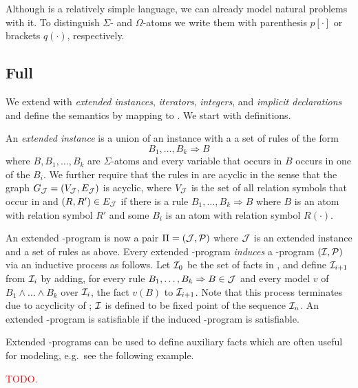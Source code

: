 \documentclass[conference]{IEEEtran}
\begin{document}
{\color{red} Although \bcore is a relatively simple language, we can
already model natural problems with it. To distinguish $\Sigma$- and
$\Omega$-atoms we write them with parenthesis $p[\cdot]$ or brackets
$q(\cdot)$,
respectively.



\begin{example}
  
\end{example}

}


\subsection{Full \bule}

We extend \bcore with \emph{extended instances}, \emph{iterators},
\emph{integers}, and \emph{implicit declarations} and define the
semantics by mapping to \bcore. We start with definitions. 

An \emph{extended instance \Jmc} is a union of an instance \Imc with a
a set of rules of the form
%
\[B_1,\ldots,B_k\Rightarrow B\]
%
where $B,B_1,\ldots,B_k$ are $\Sigma$-atoms and every variable that
occurs in $B$ occurs in one of the $B_i$. We further require that the
rules in \Jmc are acyclic in the sense that the graph $G_\mathcal{J} = (V_\mathcal{J},E_\mathcal{J})$ is
acyclic, where $V_\mathcal{J}$ is the set of all relation symbols that occur in
\Jmc and $(R,R')\in E_\mathcal{J}$ if there is a rule
$B_1,\ldots,B_k\Rightarrow B$ where $B$ is an atom with relation
symbol $R'$ and some $B_i$ is an atom with relation symbol $R(\cdot)$.  

An extended \bcore-program is now a pair $\Pi=(\mathcal{J},\mathcal{P})$ where
$\mathcal{J}$ is an extended instance and \Pmc a set of rules as above. Every
extended \bcore-program \emph{induces} a \bcore-program $(\mathcal{I},\mathcal{P})$
via an inductive process as follows. Let $\mathcal{I}_0$ be the set of facts
in \Jmc, and define $\mathcal{I}_{i+1}$ from $\mathcal{I}_i$ by adding, for every
rule $B_1,\ldots,B_k\Rightarrow B\in \mathcal{J}$ and every model $v$ of
$B_1\wedge \ldots \wedge B_k$ over $\mathcal{I}_i$, the fact $v(B)$ to
$\mathcal{I}_{i+1}$. Note that this process terminates due to acyclicity of
\Jmc; $\mathcal{I}$ is defined to be fixed point of the sequence $\mathcal{I}_n$. An
extended \bcore-program is satisfiable if the induced \bcore-program
is satisfiable. 

Extended \bcore-programs can be used to define auxiliary facts which
are often useful for modeling, e.g.~see the following example. 
%
\begin{example}
  \textcolor{red}{TODO.}
\end{example}
\end{document}
